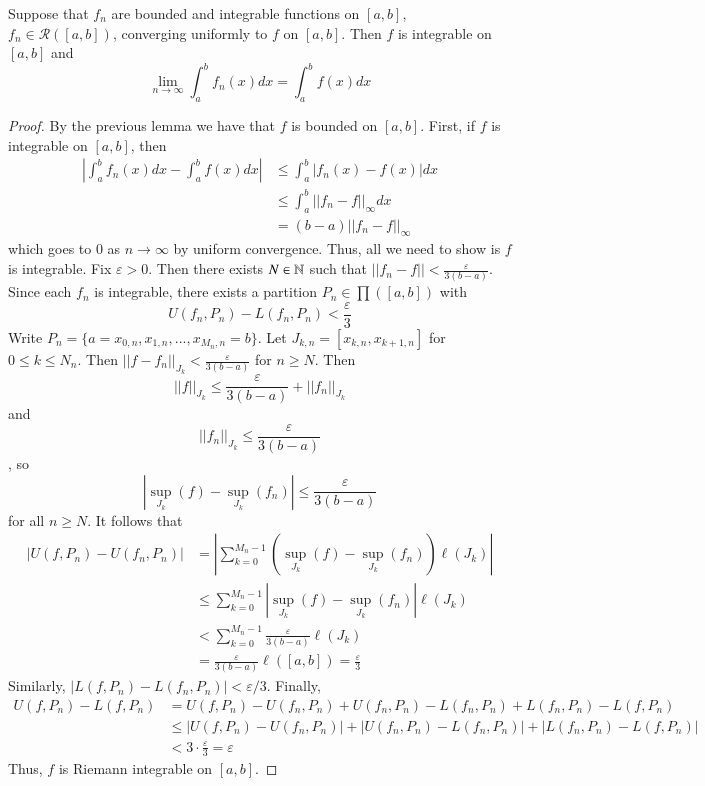 \begin{theorem}
    Suppose that $f_n$ are bounded and integrable functions on $[a,b]$, $f_n \in \mathcal{R}([a,b])$, converging uniformly to $f$ on $[a,b]$. Then $f$ is integrable on $[a,b]$ and $$\lim\limits_{n\rightarrow \infty}\int_a^bf_n(x)dx = \int_a^bf(x)dx$$
\end{theorem}
\begin{proof}
    By the previous lemma we have that $f$ is bounded on $[a,b]$. First, if $f$ is integrable on $[a,b]$, then \begin{align*}
        \left|\int_a^bf_n(x)dx - \int_a^bf(x)dx\right| &\leq \int_a^b|f_n(x)-f(x)|dx \\
        &\leq \int_a^b||f_n-f||_{\infty}dx \\
        &= (b-a)||f_n-f||_{\infty}
    \end{align*}
    which goes to $0$ as $n\rightarrow \infty$ by uniform convergence. Thus, all we need to show is $f$ is integrable. Fix $\varepsilon > 0$. Then there exists $N \in \mathbb N$ such that $||f_n - f|| < \frac{\varepsilon}{3(b-a)}$. Since each $f_n$ is integrable, there exists a partition $P_n \in \prod([a,b])$ with $$U(f_n,P_n) - L(f_n,P_n) < \frac{\varepsilon}{3}$$ Write $P_n = \{a=x_{0,n},x_{1,n},...,x_{M_n,n} = b\}$. Let $J_{k,n} = [x_{k,n},x_{k+1,n}]$ for $0 \leq k \leq N_n$. Then $||f-f_n||_{J_k} < \frac{\varepsilon}{3(b-a)}$ for $n \geq N$. Then $$||f||_{J_k} \leq \frac{\varepsilon}{3(b-a)} + ||f_n||_{J_k}$$ and $$||f_n||_{J_k} \leq \frac{\varepsilon}{3(b-a)}$$, so $$|\sup_{J_k}(f) - \sup_{J_k}(f_n)| \leq \frac{\varepsilon}{3(b-a)}$$ for all $n \geq N$. It follows that \begin{align*}
        |U(f,P_n) - U(f_n,P_n)| &= \left|\sum_{k=0}^{M_n-1}(\sup_{J_k}(f) - \sup_{J_k}(f_n))\ell(J_k)\right| \\
        &\leq \sum_{k=0}^{M_n - 1}|\sup_{J_k}(f) - \sup_{J_k}(f_n)|\ell(J_k) \\
        &< \sum_{k=0}^{M_n-1}\frac{\varepsilon}{3(b-a)}\ell(J_k) \\
        &= \frac{\varepsilon}{3(b-a)}\ell([a,b]) = \frac{\varepsilon}{3}
    \end{align*}
    Similarly, $|L(f,P_n) - L(f_n,P_n)| < \varepsilon/3$. Finally, \begin{align*}
        U(f,P_n) - L(f,P_n) &= U(f,P_n) - U(f_n,P_n) + U(f_n,P_n) - L(f_n,P_n) + L(f_n,P_n) - L(f,P_n) \\
        &\leq |U(f,P_n) - U(f_n,P_n)| + |U(f_n,P_n) - L(f_n,P_n)| + |L(f_n,P_n) - L(f,P_n)|\\
        &< 3\cdot \frac{\varepsilon}{3} = \varepsilon
    \end{align*}
    Thus, $f$ is Riemann integrable on $[a,b]$.
\end{proof}




